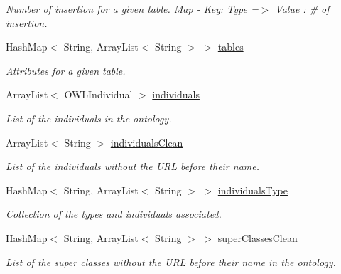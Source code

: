 \begin{DoxyCompactItemize}
\begin{DoxyCompactList}\small\item\em Number of insertion for a given table. Map -\/ Key: Type =$>$ Value : \# of insertion. \end{DoxyCompactList}\item 
HashMap$<$ String, ArrayList$<$ String $>$ $>$ \hyperlink{class_data_base_1_1_individuals_ae6a515b85461d50ad21ac1051c5133b1}{tables}
\begin{DoxyCompactList}\small\item\em Attributes for a given table. \end{DoxyCompactList}\item 
\hypertarget{class_data_base_1_1_individuals_a08ea25eeecb245fe06a36c95be656b3f}{
ArrayList$<$ OWLIndividual $>$ \hyperlink{class_data_base_1_1_individuals_a08ea25eeecb245fe06a36c95be656b3f}{individuals}}
\label{class_data_base_1_1_individuals_a08ea25eeecb245fe06a36c95be656b3f}

\begin{DoxyCompactList}\small\item\em List of the individuals in the ontology. \end{DoxyCompactList}\item 
\hypertarget{class_data_base_1_1_individuals_ae24686ef4531cd049c7a673911388cab}{
ArrayList$<$ String $>$ \hyperlink{class_data_base_1_1_individuals_ae24686ef4531cd049c7a673911388cab}{individualsClean}}
\label{class_data_base_1_1_individuals_ae24686ef4531cd049c7a673911388cab}

\begin{DoxyCompactList}\small\item\em List of the individuals without the URL before their name. \end{DoxyCompactList}\item 
HashMap$<$ String, ArrayList$<$ String $>$ $>$ \hyperlink{class_data_base_1_1_individuals_aca4c53086ef19d23f9d76616f5b67d63}{individualsType}
\begin{DoxyCompactList}\small\item\em Collection of the types and individuals associated. \end{DoxyCompactList}\item 
HashMap$<$ String, ArrayList$<$ String $>$ $>$ \hyperlink{class_data_base_1_1_individuals_ab96b206dfc1f13a8b96512de40215643}{superClassesClean}
\begin{DoxyCompactList}\small\item\em List of the super classes without the URL before their name in the ontology. \end{DoxyCompactList}\end{DoxyCompactItemize}

